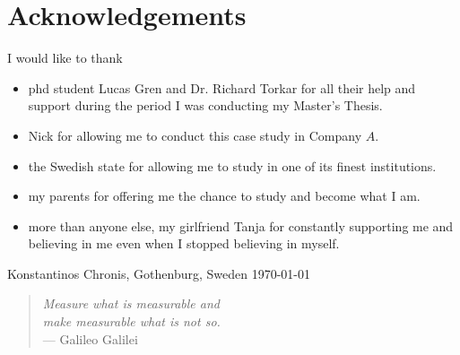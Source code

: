 \newpage
\clearpage
\mbox{}
\newpage
\clearpage
\thispagestyle{empty}
\section*{Acknowledgements}

I would like to thank
\begin{itemize}
	\item[] phd student Lucas Gren and Dr. Richard Torkar for all their help and support during the period I was conducting my Master's Thesis.
	\item[] Nick for allowing me to conduct this case study in Company $A$.
	\item[] the Swedish state for allowing me to study in one of its finest institutions.
	\item[] my parents for offering me the chance to study and become what I am. 
	\item[] more than anyone else, my girlfriend Tanja for constantly supporting me and believing in me even when I stopped believing in myself. \\[1cm]
\end{itemize}

\hfill Konstantinos Chronis, Gothenburg, Sweden \today

\newpage
\clearpage
\vspace*{\fill} 
\begin{quote} 
\centering 
{\Large \textit{Measure what is measurable and}} \\ 
{\Large \textit{make measurable what is not so.}} \\ 
\hspace{7cm} --- Galileo Galilei
\end{quote}
\vspace*{\fill}
\mbox{}

\newpage
\clearpage
\mbox{}
